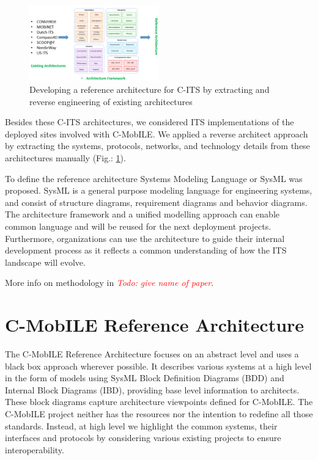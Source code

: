 \documentclass[conference]{IEEEtran}
\newcommand{\todo}[1]{\textcolor{red}{\emph{Todo: #1}}}
\begin{document}
\begin{figure}[ht!]
	\centering
	\includegraphics[width=0.5\textwidth]{methodology}
	\caption{Developing a reference architecture for C-ITS by extracting and reverse engineering of existing architectures}
	\label{methodology}
	\centering
\end{figure}

Besides these C-ITS architectures, we considered ITS implementations of the deployed sites involved with C-MobILE.
We applied a reverse architect approach by extracting the systems, protocols, networks, and technology details from these architectures manually (Fig.: \ref{methodology}).

To define the reference architecture Systems Modeling Language or SysML was proposed. SysML is a general purpose modeling language for engineering systems, and consist of structure diagrams, requirement diagrams and behavior diagrams. The architecture framework and a unified modelling approach can enable common language and will be reused for the next deployment projects. Furthermore, organizations can use the architecture to guide their internal development process as it reflects a common understanding of how the ITS landscape will evolve.

More info on methodology in \todo{give name of paper}.



\section{C-MobILE Reference Architecture}
\label{secCMobILEReferenceArchitecture}

The C-MobILE Reference Architecture focuses on an abstract level and uses a black box approach wherever possible.
It describes various systems at a high level in the form of models using SysML Block Definition Diagrams (BDD) and Internal Block Diagrams (IBD), providing base level information to architects. These block diagrams capture architecture viewpoints defined for C-MobILE. 
The C-MobILE project neither has the resources nor the intention to redefine all those standards.
Instead, at high level we highlight the common systems, their interfaces and protocols by considering various existing projects to ensure interoperability.
\end{document}
